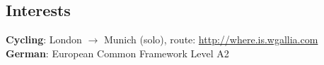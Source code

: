 \documentclass[margin,line,a4paper]{resume}
\begin{document}
\begin{resume}
\section{\mysidestyle Interests}

\textbf{Cycling}: London $\rightarrow$ Munich (solo), route: \href{http://where.is.wgallia.com}{http://where.is.wgallia.com} \vspace{1mm} \\
\textbf{German}: European Common Framework Level A2




\end{resume}
\end{document}
